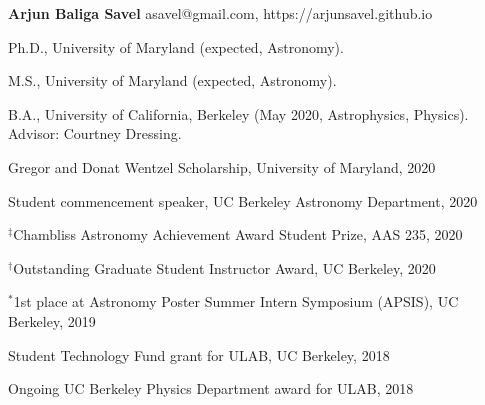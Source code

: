 \documentclass[12pt,letterpaper]{article}
\begin{document}
\thispagestyle{empty}\sloppy\sloppypar\raggedbottom

\textbf{\Large Arjun Baliga Savel} \hfill
\textsf{\small asavel@gmail.com, https://arjunsavel.github.io} \\

\begin{list}{}{\cvlist}
\item
Ph.D., University of Maryland (expected, Astronomy).
\item
M.S., University of Maryland (expected, Astronomy).
\item
B.A., University of California, Berkeley (May 2020, Astrophysics, Physics). Advisor: Courtney Dressing.
\end{list}

\begin{list}{}{\cvlist}

\item Gregor and Donat Wentzel Scholarship, University of Maryland, 2020
\item Student commencement speaker, UC Berkeley Astronomy Department, 2020
\item $^\ddagger$Chambliss Astronomy Achievement Award Student Prize, AAS 235, 2020
\item $^\dagger$Outstanding Graduate Student Instructor Award, UC Berkeley, 2020
\item $^*$1st place at Astronomy Poster Summer Intern Symposium (APSIS), UC Berkeley, 2019
\item Student Technology Fund grant for ULAB, UC Berkeley, 2018
\item Ongoing UC Berkeley Physics Department award for ULAB, 2018

\end{list}


\ifdefined\withpubs
    

    \begin{list}{}{\cvlist}
    
    \end{list}

    \begin{list}{}{\cvlist}
    
    \end{list}
\fi
\end{document}
